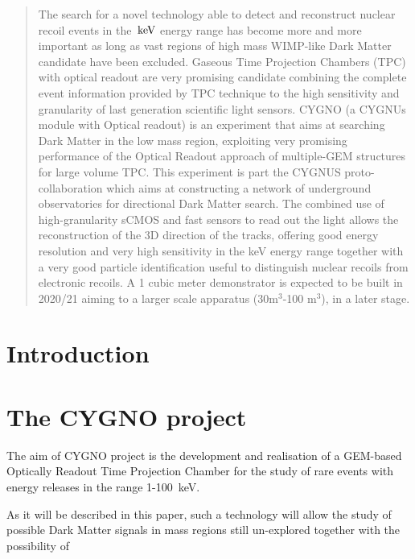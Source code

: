 \documentclass[review]{elsarticle}
\newcommand{\keV}{\ensuremath{\,\textrm{ke\hspace{-.08em}V}}\xspace}
\begin{document}
\begin{frontmatter}
\begin{abstract}
The search for a novel technology able to detect and reconstruct nuclear recoil events in the \keV energy range has become more and more important as long as vast regions of high mass WIMP-like Dark Matter candidate have been excluded.
Gaseous Time Projection Chambers (TPC) with optical readout are very promising candidate combining the complete event information provided by TPC technique to the high sensitivity and granularity of last generation scientific light sensors.
CYGNO (a CYGNUs module with Optical readout) is an experiment that aims at searching Dark Matter in the low mass region, exploiting very promising performance of the Optical Readout approach of multiple-GEM structures for large volume TPC. 
This experiment is part the CYGNUS proto-collaboration which aims at constructing a network of underground observatories
for directional Dark Matter search. 
The combined use of high-granularity sCMOS and
fast sensors to read out the light allows the reconstruction of the 3D direction of the tracks, offering good energy resolution and very high sensitivity in the keV energy range together with a very good particle identification useful to distinguish nuclear recoils from electronic
recoils. A 1 cubic meter demonstrator is expected to be built in 2020/21 aiming to a larger scale apparatus (30m$^3$-100 m$^3$), 
in a later stage.
\end{abstract}

\begin{keyword}
\end{keyword}

\end{frontmatter}

\linenumbers

\section{Introduction}
\section{The CYGNO project}

The aim of CYGNO project is the development and realisation of a GEM-based Optically Readout Time Projection Chamber for the study of rare events with energy releases in the range 1-100~keV. 

As it will be described in this paper, such a technology will allow the study of possible Dark Matter signals in mass regions still un-explored together with the possibility of 
\end{document}

